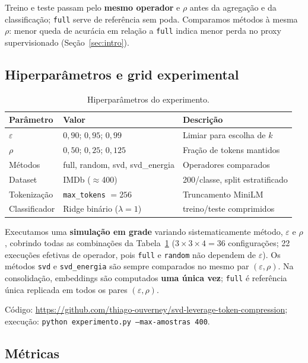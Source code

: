 Treino e teste passam pelo \textbf{mesmo operador} e $\rho$ antes da agregação e da classificação; \texttt{full} serve de referência sem poda. Comparamos métodos à mesma $\rho$: menor queda de acurácia em relação a \texttt{full} indica menor perda no proxy supervisionado (Seção~\ref{sec:intro}).

\subsection{Hiperparâmetros e grid experimental}\label{sec:protocolo}

\begin{table}[ht]
    \centering
    \caption{Hiperparâmetros do experimento.}
    \label{tab:hiper}
    \begin{tabular}{lll}
        \hline
        Parâmetro & Valor & Descrição \\
        \hline
        $\varepsilon$ & $0{,}90$; $0{,}95$; $0{,}99$ & Limiar para escolha de $k$ \\
        $\rho$ & $0{,}50$; $0{,}25$; $0{,}125$ & Fração de tokens mantidos \\
        Métodos & full, random, svd, svd\_energia & Operadores comparados \\
        Dataset & IMDb ($\approx$400) & 200/classe, split estratificado \\
        Tokenização & \texttt{max\_tokens} $= 256$ & Truncamento MiniLM \\
        Classificador & Ridge binário ($\lambda=1$) & treino/teste comprimidos \\
        \hline
    \end{tabular}
\end{table}

Executamos uma \textbf{simulação em grade} variando sistematicamente método, $\varepsilon$ e $\rho$, cobrindo todas as combinações da Tabela~\ref{tab:hiper} ($3 \times 3 \times 4 = 36$ configurações; 22 execuções efetivas de operador, pois \texttt{full} e \texttt{random} não dependem de $\varepsilon$). Os métodos \texttt{svd} e \texttt{svd\_energia} são sempre comparados no mesmo par $(\varepsilon, \rho)$. Na consolidação, embeddings são computados \textbf{uma única vez}; \texttt{full} é referência única replicada em todos os pares $(\varepsilon, \rho)$.

Código: \url{https://github.com/thiago-ouverney/svd-leverage-token-compression}; execução: \texttt{python experimento.py --max-amostras 400}.

\subsection{Métricas}\label{sec:metricas}

